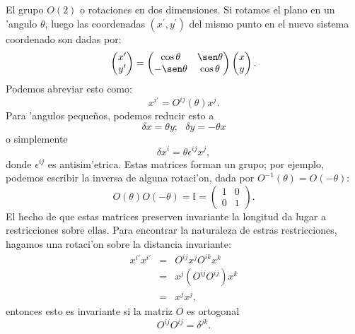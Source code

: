 El grupo $O(2)$ o rotaciones en dos dimensiones.
Si rotamos el plano en un 'angulo $\theta$, luego las coordenadas $(x^\prime,y^\prime)$ del mismo punto en el nuevo sistema coordenado son dadas por:
\begin{equation}
\begin{pmatrix}x^{\prime}\\
y^{\prime}
\end{pmatrix}=\begin{pmatrix}\cos\theta & \sen\theta\\
-\sen\theta & \cos\theta
\end{pmatrix}\begin{pmatrix}x\\
y
\end{pmatrix}.
\end{equation}
Podemos abreviar esto como:
\begin{equation}
x^{i\prime}=O^{ij}(\theta)x^j.
\end{equation}
Para 'angulos peque\~nos, podemos reducir esto a
\begin{equation}
\delta x=\theta y;\,\,\,\, \delta y=-\theta x
\end{equation}
o simplemente
\begin{equation}
\delta x^i=\theta \epsilon^{ij}x^j,
\end{equation}
donde $\epsilon^{ij}$ es antisim'etrica. Estas matrices forman un grupo; por ejemplo, podemos escribir la inversa de alguna rotaci'on, dada por $O^{-1}(\theta)=O(-\theta):$
\begin{equation}
O(\theta)O(-\theta)=\mathbb{I}=\begin{pmatrix}1 & 0\\
0 & 1
\end{pmatrix}.
\end{equation}
El hecho de que estas matrices preserven invariante la longitud da lugar a restricciones sobre ellas. Para encontrar la naturaleza de estras restricciones, hagamos una rotaci'on sobre la distancia invariante:
\begin{equation}
\begin{aligned}
x^{i\prime}x^{i\prime}&=&O^{ij}x^jO^{ik}x^k \\
&=&x^j\left(O^{ij}O^{ij}\right)x^k \\
&=& x^jx^j,
\end{aligned}
\end{equation}
entonces esto es invariante si la matriz $O$ es ortogonal
\begin{equation}
O^{ij}O^{ij}=\delta^{jk}.
\end{equation}
